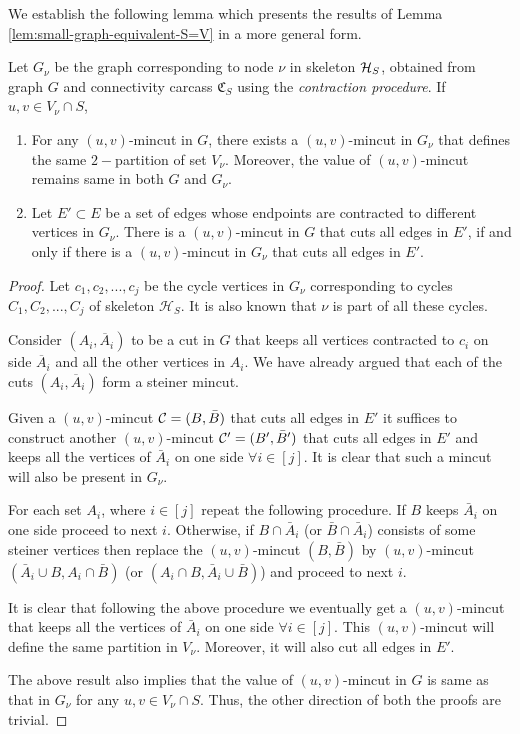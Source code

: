 
We establish the following lemma which presents the results of Lemma \ref{lem:small-graph-equivalent-S=V} in a more general form.

\begin{lemma} \label{lem:small-graph-equivalent}
Let $G_\nu$ be the graph corresponding to node $\nu$ in skeleton ${\cal H}_S$, obtained from graph $G$ and connectivity carcass $\mathfrak{C}_S$ using the \textit{contraction procedure}. If $u,v \in V_\nu \cap S$,
\begin{enumerate}
    \item For any $(u,v)$-mincut in $G$, there exists a $(u,v)$-mincut in $G_\nu$ that defines the same $2-$partition of set $V_\nu$. Moreover, the value of $(u,v)$-mincut remains same in both $G$ and $G_\nu$.
    \item Let $E' \subset E$ be a set of edges whose endpoints are contracted to different vertices in $G_\nu$. There is a $(u,v)$-mincut in $G$ that cuts all edges in $E'$, if and only if there is a $(u,v)$-mincut in $G_\nu$ that cuts all edges in $E'$.
\end{enumerate}
\end{lemma}
\begin{proof}
Let $c_1,c_2,...,c_j$ be the cycle vertices in $G_\nu$ corresponding to cycles $C_1,C_2,...,C_j$ of skeleton $\mathcal H_S$. It is also known that $\nu$ is part of all these cycles.

Consider $(A_i,\overline A_i)$ to be a cut in $G$ that keeps all vertices contracted to $c_i$ on side $\overline A_i$ and all the other vertices in $A_i$. We have already argued that each of the cuts $(A_i, \overline A_i)$ form a steiner mincut.

Given a $(u,v)$-mincut ${\cal C}=(B,{\bar B})$ that cuts all edges in $E'$ it suffices to construct another $(u,v)$-mincut ${\cal C}'=(B',{\bar B'})$ that cuts all edges in $E'$ and keeps all the vertices of ${\bar A_i}$ on one side $\forall i \in [j]$. It is clear that such a mincut will also be present in $G_\nu$.

For each set $A_i$, where $i\in [j]$ repeat the following procedure. If $B$ keeps ${\bar A_i}$ on one side proceed to next $i$. Otherwise, if $B\cap {\bar A_i}$ (or ${\bar B}\cap {\bar A_i}$) consists of some steiner vertices then replace the $(u,v)$-mincut $(B,{\bar B})$ by $(u,v)$-mincut $({\bar A_i}\cup B,A_i\cap {\bar B})$ (or $(A_i\cap B,{\bar A_i}\cup {\bar B})$) and proceed to next $i$.

It is clear that following the above procedure we eventually get a $(u,v)$-mincut that keeps all the vertices of ${\bar A_i}$ on one side $\forall i \in [j]$. This $(u,v)$-mincut will define the same partition in $V_\nu$. Moreover, it will also cut all edges in $E'$.

The above result also implies that the value of $(u,v)$-mincut in $G$ is same as that in $G_\nu$ for any $u,v \in V_\nu \cap S$. Thus, the other direction of both the proofs are trivial.
\end{proof}

